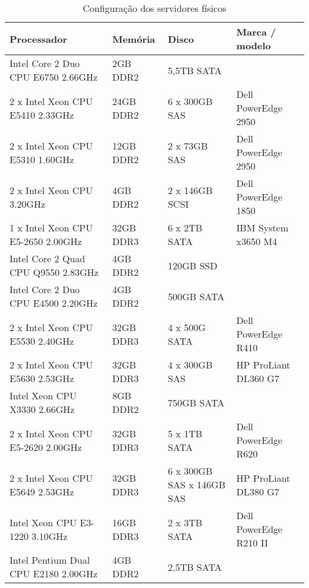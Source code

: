 \begin{table}
\caption {Configuração dos servidores físicos}
\label{tab:servfisicos}
\begin{center}
\begin{tabular}{|p{4.3cm}|p{3cm}|p{3cm}|l|}\hline
Processador & Memória & Disco & Marca / modelo\\\hline
Intel Core 2 Duo \newline CPU E6750 2.66GHz & 2GB DDR2 & 5,5TB SATA & \\\hline
2 x Intel Xeon \newline CPU E5410 2.33GHz & 24GB DDR2 & 6 x 300GB SAS & Dell PowerEdge 2950\\\hline
2 x Intel Xeon \newline CPU E5310 1.60GHz & 12GB DDR2 & 2 x 73GB SAS & Dell PowerEdge 2950\\\hline
2 x Intel Xeon \newline CPU 3.20GHz & 4GB DDR2 & 2 x 146GB SCSI & Dell PowerEdge 1850\\\hline
1 x Intel Xeon \newline CPU E5-2650 2.00GHz & 32GB DDR3 & 6 x 2TB SATA & IBM System x3650 M4\\\hline
Intel Core 2 Quad \newline CPU Q9550 2.83GHz & 4GB DDR2 & 120GB SSD & \\\hline
Intel Core 2 Duo \newline CPU E4500 2.20GHz & 4GB DDR2 & 500GB SATA & \\\hline
2 x Intel Xeon \newline CPU E5530 2.40GHz & 32GB DDR3 & 4 x 500G SATA & Dell PowerEdge R410\\\hline
2 x  Intel Xeon \newline CPU E5630 2.53GHz & 32GB DDR3 & 4 x 300GB SAS & HP ProLiant DL360 G7\\\hline
Intel Xeon \newline CPU X3330 2.66GHz & 8GB DDR2 & 750GB SATA & \\\hline
2 x Intel Xeon \newline CPU E5-2620 2.00GHz & 32GB DDR3 & 5 x 1TB SATA & Dell PowerEdge R620\\\hline
2 x Intel Xeon \newline CPU E5649 2.53GHz & 32GB DDR3 & 6 x 300GB SAS \newline 2 x 146GB SAS & HP ProLiant DL380 G7\\\hline
Intel Xeon CPU \newline E3-1220 3.10GHz & 16GB DDR3 & 2 x 3TB SATA & Dell PowerEdge R210 II\\\hline
Intel Pentium Dual CPU E2180 2.00GHz & 4GB DDR2 & 2,5TB SATA & \\\hline
\end{tabular}
\end{center}
\end{table}

